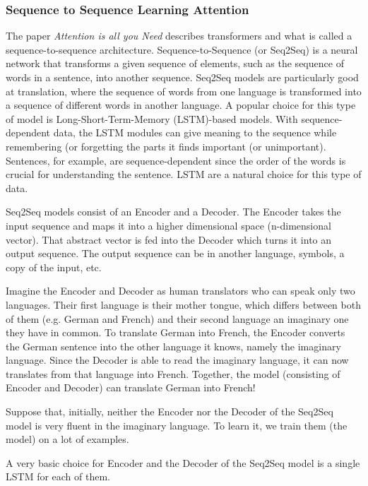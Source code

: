 \subsubsection{Sequence to Sequence Learning Attention}
The paper \textit{Attention is all you Need} describes transformers and what is called a sequence-to-sequence architecture. Sequence-to-Sequence (or Seq2Seq) is a neural network that transforms a given sequence of elements, such as the sequence of words in a sentence, into another sequence. Seq2Seq models are particularly good at translation, where the sequence of words from one language is transformed into a sequence of different words in another language. A popular choice for this type of model is Long-Short-Term-Memory (LSTM)-based models. With sequence-dependent data, the LSTM modules can give meaning to the sequence while remembering (or forgetting the parts it finds important (or unimportant). Sentences, for example, are sequence-dependent since the order of the words is crucial for understanding the sentence. LSTM are a natural choice for this type of data. \newline

Seq2Seq models consist of an Encoder and a Decoder. The Encoder takes the input sequence and maps it into a higher dimensional space (n-dimensional vector). That abstract vector is fed into the Decoder which turns it into an output sequence. The output sequence can be in another language, symbols, a copy of the input, etc. \newline

Imagine the Encoder and Decoder as human translators who can speak only two languages. Their first language is their mother tongue, which differs between both of them (e.g. German and French) and their second language an imaginary one they have in common. To translate German into French, the Encoder converts the German sentence into the other language it knows, namely the imaginary language. Since the Decoder is able to read the imaginary language, it can now translates from that language into French. Together, the model (consisting of Encoder and Decoder) can translate German into French! \newline

Suppose that, initially, neither the Encoder nor the Decoder of the Seq2Seq model is very fluent in the imaginary language. To learn it, we train them (the model) on a lot of examples. \newline

A very basic choice for Encoder and the Decoder of the Seq2Seq model is a single LSTM for each of them. \newline


